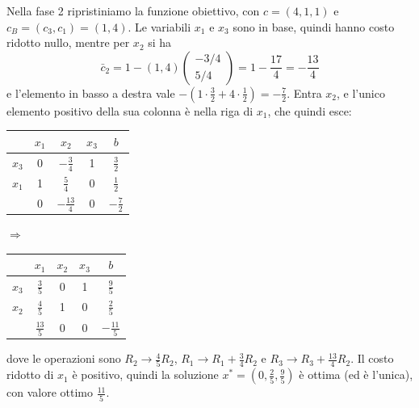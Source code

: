 Nella fase 2 ripristiniamo la funzione obiettivo, con $c = (4, 1, 1)$ e $c_B = (c_3, c_1) = (1, 4)$. Le variabili $x_1$ e $x_3$ sono in base, quindi hanno costo ridotto nullo, mentre per $x_2$ si ha
\[
\bar{c}_2 = 1 - (1, 4) \begin{pmatrix} -3/4 \\ 5/4 \end{pmatrix} = 1 - \frac{17}{4} = -\frac{13}{4}
\]
e l'elemento in basso a destra vale $-(1 \cdot \frac32 + 4 \cdot \frac12) = -\frac72$. Entra $x_2$, e l'unico elemento positivo della sua colonna è nella riga di $x_1$, che quindi esce:
\begin{center}
\begin{tabular}{c|ccc|c}
 & $x_1$ & $x_2$ & $x_3$ & $b$ \\
\hline
$x_3$ & 0 & $-\frac34$ & 1 & $\frac32$ \\
$x_1$ & 1 & $\boxed{\tfrac54}$ & 0 & $\frac12$ \\
\hline
 & 0 & $-\frac{13}{4}$ & 0 & $-\frac72$ \\
\end{tabular}
\qquad$\Longrightarrow$\qquad
\begin{tabular}{c|ccc|c}
 & $x_1$ & $x_2$ & $x_3$ & $b$ \\
\hline
$x_3$ & $\frac35$ & 0 & 1 & $\frac95$ \\
$x_2$ & $\frac45$ & 1 & 0 & $\frac25$ \\
\hline
 & $\frac{13}{5}$ & 0 & 0 & $-\frac{11}{5}$ \\
\end{tabular}
\end{center}
dove le operazioni sono $R_2 \to \frac45 R_2$, $R_1 \to R_1 + \frac34 R_2$ e $R_3 \to R_3 + \frac{13}{4} R_2$. Il costo ridotto di $x_1$ è positivo, quindi la soluzione $x^* = (0, \frac25, \frac95)$ è ottima (ed è l'unica), con valore ottimo $\frac{11}{5}$.

